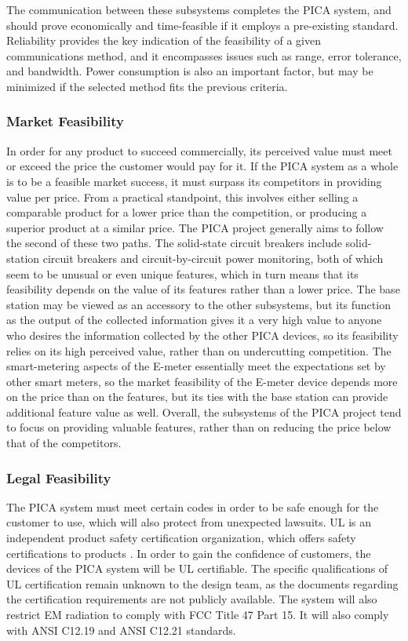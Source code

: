 The communication between these subsystems completes the PICA system, and should prove economically and time-feasible if it employs a pre-existing standard. Reliability provides the key indication of the feasibility of a given communications method, and it encompasses issues such as range, error tolerance, and bandwidth. Power consumption is also an important factor, but may be minimized if the selected method fits the previous criteria. 

\subsubsection{Market Feasibility} %
In order for any product to succeed commercially, its perceived value must meet or exceed the price the customer would pay for it. If the PICA system as a whole is to be a feasible market success, it must surpass its competitors in providing value per price. From a practical standpoint, this involves either selling a comparable product for a lower price than the competition, or producing a superior product at a similar price. The PICA project generally aims to follow the second of these two paths. The solid-state circuit breakers include solid-station circuit breakers and circuit-by-circuit power monitoring, both of which seem to be unusual or even unique features, which in turn means that its feasibility depends on the value of its features rather than a lower price. The base station may be viewed as an accessory to the other subsystems, but its function as the output of the collected information gives it a very high value to anyone who desires the information collected by the other PICA devices, so its feasibility relies on its high perceived value, rather than on undercutting competition. The smart-metering aspects of the E-meter essentially meet the expectations set by other smart meters, so the market feasibility of the E-meter device depends more on the price than on the features, but its ties with the base station can provide additional feature value as well. Overall, the subsystems of the PICA project tend to focus on providing valuable features, rather than on reducing the price below that of the competitors.

\subsubsection{Legal Feasibility} %
The PICA system must meet certain codes in order to be safe enough for the customer to use, which will also protect from unexpected lawsuits. \ac{UL} is an independent product safety certification organization, which offers safety certifications to products \cite{UL_Web}. In order to gain the confidence of customers, the devices of the PICA system will be UL certifiable. The specific qualifications of \ac{UL} certification remain unknown to the design team, as the documents regarding the certification requirements are not publicly available. The system will also restrict \ac{EM} radiation to comply with \ac{FCC} Title 47 Part 15. It will also comply with \ac{ANSI} C12.19 and \ac{ANSI} C12.21 standards.

